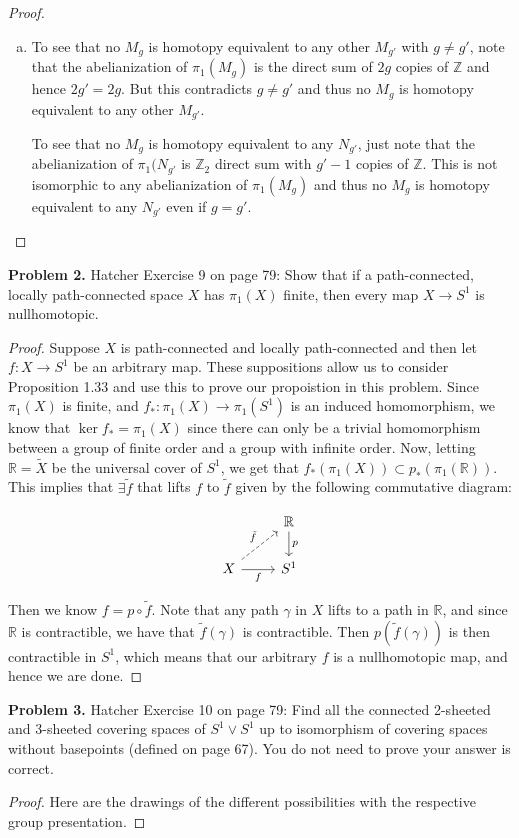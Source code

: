 \documentclass[leqno]{article}
\theoremstyle{nonumberplain}
\newtheorem{proof}{Proof}
\newcommand{\R}{\mathbb{R}}
\newcommand{\Z}{\mathbb{Z}}
\begin{document}
\begin{proof}
\begin{enumerate}[(a)]
\item To see that no $M_g$ is homotopy equivalent to any other $M_{g'}$ with $g \neq g'$, note that the abelianization of $\pi_1(M_g)$ is the direct sum of $2g$ copies of $\Z$ and hence $2g'=2g$.  But this contradicts $g\neq g'$ and thus no $M_g$ is homotopy equivalent to any other $M_{g'}$.  

To see that no $M_g$ is homotopy equivalent to any $N_{g'}$, just note that the abelianization of $\pi_1(N_{g'}$ is $\Z_2$ direct sum with $g'-1$ copies of $\Z$.  This is not isomorphic to any abelianization of $\pi_1(M_g)$ and thus no $M_g$ is homotopy equivalent to any $N_{g'}$ even if $g=g'$.
\end{enumerate}
\end{proof}

\vspace*{1cm}


\noindent\textbf{Problem 2.} Hatcher Exercise 9 on page 79: Show that if a path-connected, locally path-connected space $X$ has $\pi_1(X)$ finite, then every map $X\to S^1$ is nullhomotopic.

\begin{proof}
Suppose $X$ is path-connected and locally path-connected and then let $f \colon X \to S^1$ be an arbitrary map. These suppositions allow us to consider Proposition 1.33 and use this to prove our propoistion in this problem.  Since $\pi_1(X)$ is finite, and $f_*\colon \pi_1(X)\to \pi_1(S^1)$ is an induced homomorphism, we know that $\ker f_* = \pi_1(X)$ since there can only be a trivial homomorphism between a group of finite order and a group with infinite order. Now, letting $\R=\tilde{X}$ be the universal cover of $S^1$, we get that $f_*(\pi_1(X))\subset p_*(\pi_1(\R))$.  This implies that $\exists \tilde{f}$ that lifts $f$ to $\tilde{f}$ given by the following commutative diagram:
\begin{center}
\[
\begin{tikzcd}
 & \mathbb{R} \arrow[d, "p"] \\
X \arrow[ru, "\tilde{f}", dashed] \arrow[r, "f"'] & S^1
\end{tikzcd}
\]
\end{center}
Then we know $f=p\circ \tilde{f}$.  Note that any path $\gamma$ in $X$ lifts to a path in $\R$, and since $\R$ is contractible, we have that $\tilde{f}(\gamma)$ is contractible.  Then $p(\tilde{f}(\gamma))$ is then contractible in $S^1$, which means that our arbitrary $f$ is a nullhomotopic map, and hence we are done.
\end{proof}

\vspace*{1cm}



\noindent\textbf{Problem 3.} Hatcher Exercise 10 on page 79: Find all the connected 2-sheeted and 3-sheeted covering spaces of $S^1\vee S^1$ up to isomorphism of covering spaces without basepoints (defined on page 67). You do not need to prove your answer is correct.


\begin{proof}
Here are the drawings of the different possibilities with the respective group presentation.
\end{proof}
\end{document}
